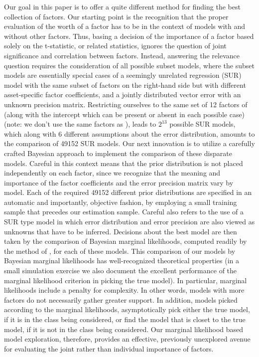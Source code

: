 \documentclass[12pt]{article}
\begin{document}
  Our goal in this paper is to offer a quite different method for finding the best collection of factors. Our starting point is the recognition that the proper evaluation of the worth of a factor has to be in the context of models with and without other factors. Thus, basing a decision of the importance of a factor based solely on the t-statistic, or related statistics, ignores the question of joint significance and correlation between factors. Instead, answering the relevance question requires the consideration of all possible subset models, where the subset models are essentially special cases of a seemingly unrelated regression (SUR) model with the same subset of factors on the right-hand side but with different asset-specific factor coefficients, and a jointly distributed vector error with an unknown precision matrix. Restricting ourselves to the same set of 12 factors of \cite{harvey2015lucky} (along with the intercept which can be present or absent in each possible case)(note: we don't use the same factors as \cite{harvey2015lucky}), leads to $2^{13}$ possible SUR models, which along with 6 different assumptions about the error distribution, amounts to the comparison of 49152 SUR models. Our next innovation is to utilize a carefully crafted Bayesian approach to implement the comparison of these disparate models. Careful in this context means that the prior distribution is not placed independently on each factor, since we recognize that the meaning and importance of the factor coefficients and the error precision matrix vary by model. Each of the required 49152 different prior distributions are specified in an automatic and importantly, objective fashion, by employing a small training sample that precedes our estimation sample. Careful also refers to the use of a SUR type model in which error distribution and error precision are also viewed as unknowns that have to be inferred. Decisions about the best model are then taken by the comparison of Bayesian marginal likelihoods, computed readily by the method of \cite{chib1995marginal}, for each of these models. This comparison of our models by Bayesian marginal likelihoods has well-recognized theoretical properties (in a small simulation exercise we also document the excellent performance of the marginal likelihood criterion in picking the true model). In particular, marginal likelihoods include a penalty for complexity. In other words, models with more factors do not necessarily gather greater support. In addition, models picked according to the marginal likelihoods, asymptotically pick either the true model, if it is in the class being considered, or find the model that is closet to the true model, if it is not in the class being considered. Our marginal likelihood based model exploration, therefore, provides an effective, previously unexplored avenue for evaluating the joint rather than individual importance of factors.  
\end{document}

